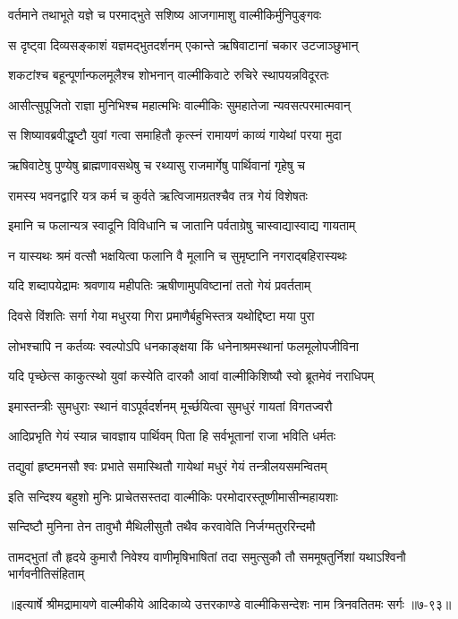 
\twolineshloka
{वर्तमाने तथाभूते यज्ञे च परमाद्भुते}
{सशिष्य आजगामाशु वाल्मीकिर्मुनिपुङ्गवः} %

\twolineshloka
{स दृष्ट्वा दिव्यसङ्काशं यज्ञमद्भुतदर्शनम्}
{एकान्ते ऋषिवाटानां चकार उटजाञ्छुभान्} %

\twolineshloka
{शकटांश्च बहून्पूर्णान्फलमूलैश्च शोभनान्}
{वाल्मीकिवाटे रुचिरे स्थापयन्नविदूरतः} %

\twolineshloka
{आसीत्सुपूजितो राज्ञा मुनिभिश्च महात्मभिः}
{वाल्मीकिः सुमहातेजा न्यवसत्परमात्मवान्} %

\twolineshloka
{स शिष्यावब्रवीद्धृष्टौ युवां गत्वा समाहितौ}
{कृत्स्नं रामायणं काव्यं गायेथां परया मुदा} %

\twolineshloka
{ऋषिवाटेषु पुण्येषु ब्राह्मणावसथेषु च}
{रथ्यासु राजमार्गेषु पार्थिवानां गृहेषु च} %

\twolineshloka
{रामस्य भवनद्वारि यत्र कर्म च कुर्वते}
{ऋत्विजामग्रतश्चैव तत्र गेयं विशेषतः} %

\twolineshloka
{इमानि च फलान्यत्र स्वादूनि विविधानि च}
{जातानि पर्वताग्रेषु चास्वाद्यास्वाद्य गायताम्} %

\twolineshloka
{न यास्यथः श्रमं वत्सौ भक्षयित्वा फलानि वै}
{मूलानि च सुमृष्टानि नगराद्बहिरास्यथः} %

\twolineshloka
{यदि शब्दापयेद्रामः श्रवणाय महीपतिः}
{ऋषीणामुपविष्टानां ततो गेयं प्रवर्तताम्} %

\twolineshloka
{दिवसे विंशतिः सर्गा गेया मधुरया गिरा}
{प्रमाणैर्बहुभिस्तत्र यथोद्दिष्टा मया पुरा} %

\twolineshloka
{लोभश्चापि न कर्तव्यः स्वल्पोऽपि धनकाङ्क्षया}
{किं धनेनाश्रमस्थानां फलमूलोपजीविना} %

\twolineshloka
{यदि पृच्छेत्स काकुत्स्थो युवां कस्येति दारकौ}
{आवां वाल्मीकिशिष्यौ स्वो ब्रूतमेवं नराधिपम्} %

\twolineshloka
{इमास्तन्त्रीः सुमधुराः स्थानं वाऽपूर्वदर्शनम्}
{मूर्च्छयित्वा सुमधुरं गायतां विगतज्वरौ} %

\twolineshloka
{आदिप्रभृति गेयं स्यान्न चावज्ञाय पार्थिवम्}
{पिता हि सर्वभूतानां राजा भविति धर्मतः} %

\twolineshloka
{तद्युवां हृष्टमनसौ श्वः प्रभाते समास्थितौ}
{गायेथां मधुरं गेयं तन्त्रीलयसमन्वितम्} %

\twolineshloka
{इति सन्दिश्य बहुशो मुनिः प्राचेतसस्तदा}
{वाल्मीकिः परमोदारस्तूष्णीमासीन्महायशाः} %

\twolineshloka
{सन्दिष्टौ मुनिना तेन तावुभौ मैथिलीसुतौ}
{तथैव करवावेति निर्जग्मतुररिन्दमौ} %

\twolineshloka
{तामद्भुतां तौ हृदये कुमारौ निवेश्य वाणीमृषिभाषितां तदा}
{समुत्सुकौ तौ सममूषतुर्निशां यथाऽश्विनौ भार्गवनीतिसंहिताम्} %


॥इत्यार्षे श्रीमद्रामायणे वाल्मीकीये आदिकाव्ये उत्तरकाण्डे वाल्मीकिसन्देशः नाम त्रिनवतितमः सर्गः ॥७-९३॥
